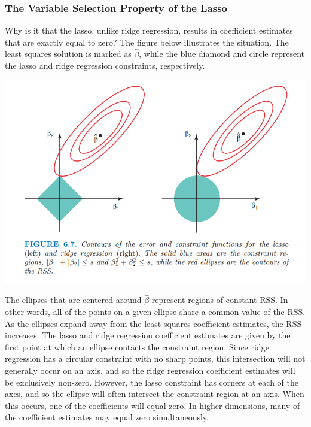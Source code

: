 \subsubsection{The Variable Selection Property of the Lasso}
Why is it that the lasso, unlike ridge regression, results in coefficient estimates that are exactly equal to zero? The figure below illustrates the situation. The least squares solution is marked as $\hat{\beta}$, while the blue diamond and circle represent the lasso and ridge regression constraints, respectively.
\begin{center}
    \includegraphics[scale=0.7]{images/ridge-lasso-geom.png}
\end{center}
The ellipses that are centered around $\hat{\beta}$ represent regions of constant
RSS. In other words, all of the points on a given ellipse share a common value of the RSS. As the ellipses expand away from the least squares coefficient estimates, the RSS increases. The lasso and ridge regression coefficient estimates are given by the first point at which an ellipse contacts the constraint region. Since ridge
regression has a circular constraint with no sharp points, this intersection will not generally occur on an axis, and so the ridge regression coefficient estimates will be exclusively non-zero. However, the lasso constraint has corners at each of the axes, and so the ellipse will often intersect the constraint region at an axis. When this occurs, one of the coefficients will equal zero. In higher dimensions, many of the coefficient estimates may equal zero simultaneously.

